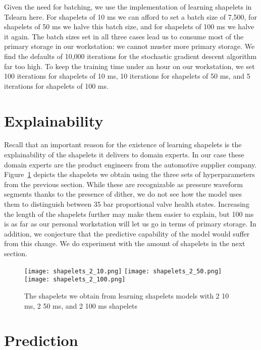 Given the need for batching, we use the implementation of learning shapelets in Tslearn here.
For shapelets of 10 ms we can afford to set a batch size of 7,500, for shapelets of 50 ms we halve this batch size, and for shapelets of 100 ms we halve it again.
The batch sizes set in all three cases lead us to consume most of the primary storage in our workstation\thinspace: we cannot muster more primary storage.
We find the defaults of 10,000 iterations for the stochastic gradient descent algorithm far too high.
To keep the training time under an hour on our workstation, we set 100 iterations for shapelets of 10 ms, 10 iterations for shapelets of 50 ms, and 5 iterations for shapelets of 100 ms.

\section{Explainability}

Recall that an important reason for the existence of learning shapelets is the explainability of the shapelets it delivers to domain experts.
In our case these domain experts are the product engineers from the automotive supplier company.
Figure~\ref{fig:shapelets} depicts the shapelets we obtain using the three sets of hyperparameters from the previous section.
While these are recognizable as pressure waveform segments thanks to the presence of dither, we do not see how the model uses them to distinguish between 35 bar proportional valve health states.
Increasing the length of the shapelets further may make them easier to explain, but 100 ms is as far as our personal workstation will let us go in terms of primary storage.
In addition, we conjecture that the predictive capability of the model would suffer from this change.
We do experiment with the amount of shapelets in the next section.

\begin{figure}
  \begin{center}
  \texttt{[image: shapelets\_2\_10.png]}
  \texttt{[image: shapelets\_2\_50.png]}
  \texttt{[image: shapelets\_2\_100.png]}
  \end{center}
  \caption{The shapelets we obtain from learning shapelets models with 2 10 ms, 2 50 ms, and 2 100 ms shapelets}
  \label{fig:shapelets}
\end{figure}

\section{Prediction}


